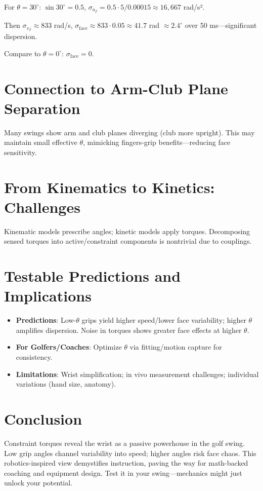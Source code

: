 \documentclass[11pt]{article}
\begin{document}
For $\theta = 30^\circ$: $\sin 30^\circ = 0.5$, $\sigma_{a_\beta} = 0.5 \cdot 5 / 0.00015 \approx 16,667$ rad/s².

Then $\sigma_{v_\beta} \approx 833$ rad/s, $\sigma_{\text{face}} \approx 833 \cdot 0.05 \approx 41.7$ rad $\approx 2.4^\circ$ over 50 ms—significant dispersion.

Compare to $\theta = 0^\circ$: $\sigma_{\text{face}} = 0$.

\section{Connection to Arm-Club Plane Separation}

Many swings show arm and club planes diverging (club more upright). This may maintain small effective $\theta$, mimicking fingers-grip benefits—reducing face sensitivity.

\section{From Kinematics to Kinetics: Challenges}

Kinematic models prescribe angles; kinetic models apply torques. Decomposing sensed torques into active/constraint components is nontrivial due to couplings.

\section{Testable Predictions and Implications}

\begin{itemize}
    \item \textbf{Predictions}: Low-$\theta$ grips yield higher speed/lower face variability; higher $\theta$ amplifies dispersion. Noise in torques shows greater face effects at higher $\theta$.
    \item \textbf{For Golfers/Coaches}: Optimize $\theta$ via fitting/motion capture for consistency.
    \item \textbf{Limitations}: Wrist simplification; in vivo measurement challenges; individual variations (hand size, anatomy).
\end{itemize}

\section{Conclusion}

Constraint torques reveal the wrist as a passive powerhouse in the golf swing. Low grip angles channel variability into speed; higher angles risk face chaos. This robotics-inspired view demystifies instruction, paving the way for math-backed coaching and equipment design. Test it in your swing—mechanics might just unlock your potential.
\end{document}
